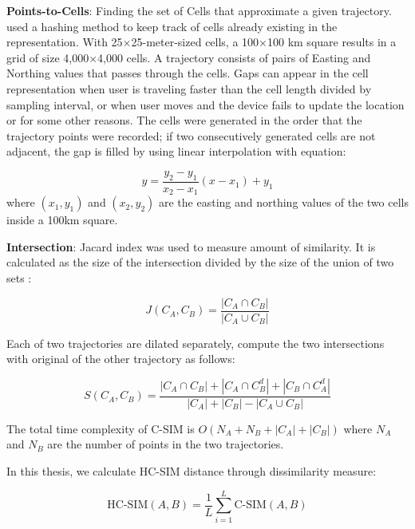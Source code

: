 \documentclass[a4paper, 12pt]{article}
\begin{document}
\textbf{Points-to-Cells}: Finding the set of Cells that approximate a given trajectory. \cite{mariescu2017grid} used a hashing method to keep track of cells already existing in the representation. With 25×25-meter-sized cells, a 100×100 km square results in a grid of size 4,000×4,000 cells. A trajectory consists of pairs of Easting and Northing values that passes through the cells. Gaps can appear in the cell representation when user is traveling faster than the cell length divided by sampling interval, or when user moves and the device fails to update the location or for some other reasons. The cells were generated in the order that the trajectory points were recorded; if two consecutively generated cells are not adjacent, the gap is filled by using linear interpolation with equation:

\begin{equation} \label{eq12}
    y = \frac{y_2 - y_1}{x_2 - x_1}(x - x_1) + y_1
\end{equation}
where $(x_1, y_1)$ and $(x_2, y_2)$ are the easting and northing values of the two cells inside a 100km square.

\textbf{Intersection}: Jacard index was used to measure amount of similarity. It is calculated as the size of the intersection divided by the size of the union of two sets \citep{mariescu2017grid}:

\begin{equation} \label{eq13}
    J(C_A, C_B) = \frac{|C_A \cap C_B|}{|C_A \cup C_B|}
\end{equation}

Each of two trajectories are dilated separately, compute the two intersections with original of the other trajectory as follows:

\begin{equation} \label{eq14}
    S(C_A, C_B) = \frac{|C_A \cap C_B| + |C_A \cap C_B^d| + |C_B \cap C_A^d|}{|C_A| + |C_B| - |C_A \cup C_B|}
\end{equation}

The total time complexity of C-SIM is $O(N_A + N_B + |C_A| + |C_B|)$ where $N_A$ and $N_B$ are the number of points in the two trajectories.

In this thesis, we calculate HC-SIM distance through dissimilarity measure:

\begin{equation} \label{eq15}
    \text{HC-SIM}(A, B) = \frac{1}{L} \sum_{i=1}^{L}\text{C-SIM}(A, B)
\end{equation}
\end{document}
